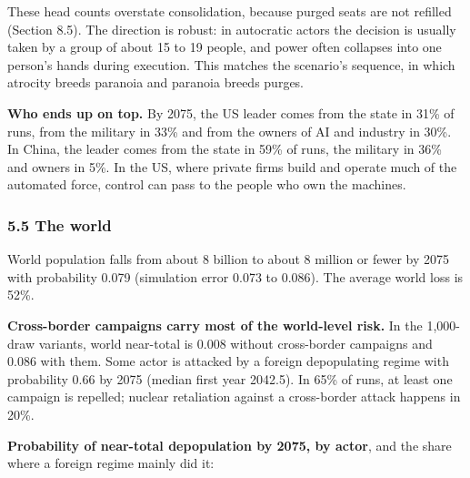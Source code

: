 \documentclass[
  10pt,
]{article}
\begin{document}
These head counts overstate consolidation, because purged seats are not refilled (Section 8.5). The
direction is robust: in autocratic actors the decision is usually taken by a group of about 15 to 19
people, and power often collapses into one person's hands during execution. This matches the
scenario's sequence, in which atrocity breeds paranoia and paranoia breeds purges.

\textbf{Who ends up on top.} By 2075, the US leader comes from the state in 31\% of runs, from the
military in 33\% and from the owners of AI and industry in 30\%. In China, the leader comes from the
state in 59\% of runs, the military in 36\% and owners in 5\%. In the US, where private firms build
and operate much of the automated force, control can pass to the people who own the machines.

\subsubsection{5.5 The world}\label{the-world}

World population falls from about 8 billion to about 8 million or fewer by 2075 with probability
0.079 (simulation error 0.073 to 0.086). The average world loss is 52\%.

\textbf{Cross-border campaigns carry most of the world-level risk.} In the 1,000-draw variants,
world near-total is 0.008 without cross-border campaigns and 0.086 with them. Some actor is attacked
by a foreign depopulating regime with probability 0.66 by 2075 (median first year 2042.5). In 65\%
of runs, at least one campaign is repelled; nuclear retaliation against a cross-border attack
happens in 20\%.

\textbf{Probability of near-total depopulation by 2075, by actor}, and the share where a foreign
regime mainly did it:
\end{document}
